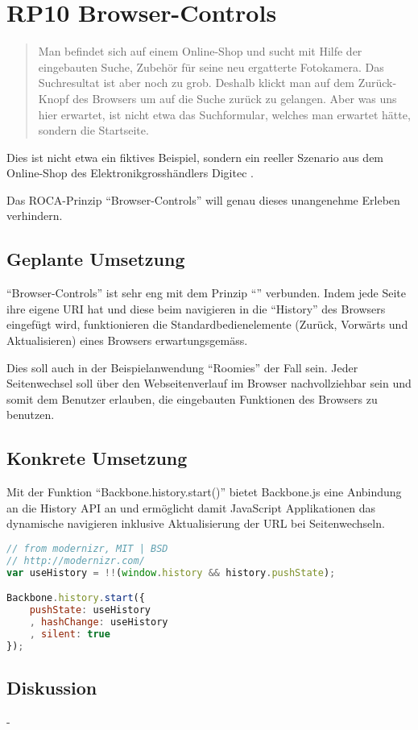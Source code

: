 \section{RP10 Browser-Controls}
\label{sec:principle-rp10-browser-controls}
\begin{quotation}
Man befindet sich auf einem Online-Shop und sucht mit Hilfe der eingebauten Suche, Zubehör für seine neu ergatterte Fotokamera. Das Suchresultat ist aber noch zu grob. Deshalb klickt man auf dem Zurück-Knopf des Browsers um auf die Suche zurück zu gelangen. Aber was uns hier erwartet, ist nicht etwa das Suchformular, welches man erwartet hätte, sondern die Startseite.
\end{quotation}
Dies ist nicht etwa ein fiktives Beispiel, sondern ein reeller Szenario aus dem Online-Shop des Elektronikgrosshändlers Digitec \cite{Digitec}.

Das ROCA-Prinzip ``Browser-Controls'' will genau dieses unangenehme Erleben verhindern.

\subsection*{Geplante Umsetzung}

``Browser-Controls'' ist sehr eng mit dem Prinzip ``'' verbunden. Indem jede Seite ihre eigene \gls{URI} hat und diese beim navigieren in die ``History'' des Browsers eingefügt wird, funktionieren die Standardbedienelemente (Zurück, Vorwärts und Aktualisieren) eines Browsers erwartungsgemäss.

Dies soll auch in der Beispielanwendung ``Roomies'' der Fall sein. Jeder Seitenwechsel soll über den Webseitenverlauf im Browser nachvollziehbar sein und somit dem Benutzer erlauben, die eingebauten Funktionen des Browsers zu benutzen.

\subsection*{Konkrete Umsetzung}
Mit der Funktion ``Backbone.history.start()'' \cite{BackbonejsHistory} bietet Backbone.js eine Anbindung an die History API \cite{HistoryAPI} an und ermöglicht damit JavaScript Applikationen das dynamische navigieren inklusive Aktualisierung der URL bei Seitenwechseln.

\begin{lstlisting}[language=JavaScript, caption=Activierung der History in Barefoot \cite{BarefootStartClient}, label=lst:barefootStartClientHistory, firstnumber=29]
// from modernizr, MIT | BSD
// http://modernizr.com/
var useHistory = !!(window.history && history.pushState);

Backbone.history.start({
	pushState: useHistory
	, hashChange: useHistory
	, silent: true
});
\end{lstlisting}

\subsection*{Diskussion}
-